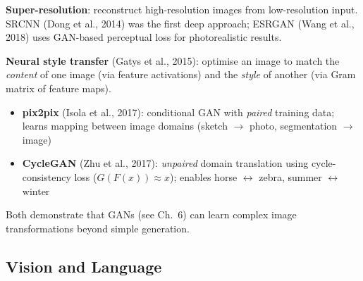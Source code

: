 \begin{tcbitemize}[ skin=sectionraster ]
    \tcbitem[title={Super-Resolution and Style Transfer}, raster multicolumn=3]
    \textbf{Super-resolution}: reconstruct high-resolution images from low-resolution input.
    SRCNN (Dong et al., 2014) was the first deep approach; ESRGAN (Wang et al., 2018) uses GAN-based perceptual loss for photorealistic results.

    \textbf{Neural style transfer} (Gatys et al., 2015): optimise an image to match the \emph{content} of one image (via feature activations) and the \emph{style} of another (via Gram matrix of feature maps).

    \tcbitem[title={Image-to-Image Translation}, raster multicolumn=3]
    \begin{itemize}
        \item \textbf{pix2pix} (Isola et al., 2017): conditional GAN with \emph{paired} training data; learns mapping between image domains (sketch $\to$ photo, segmentation $\to$ image)
        \item \textbf{CycleGAN} (Zhu et al., 2017): \emph{unpaired} domain translation using cycle-consistency loss ($G(F(x)) \approx x$); enables horse $\leftrightarrow$ zebra, summer $\leftrightarrow$ winter
    \end{itemize}
    Both demonstrate that GANs (see Ch.~6) can learn complex image transformations beyond simple generation.
\end{tcbitemize}

\subsection{Vision and Language}

